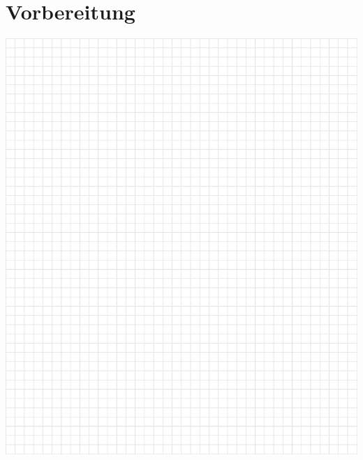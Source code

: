 \chapter{Vorbereitung}
\thispagestyle{fancy}

\begin{center}
	\includegraphics[]{img/latex_karo_bl.png}
	\newpage
	\thispagestyle{fancy}

\end{center}
